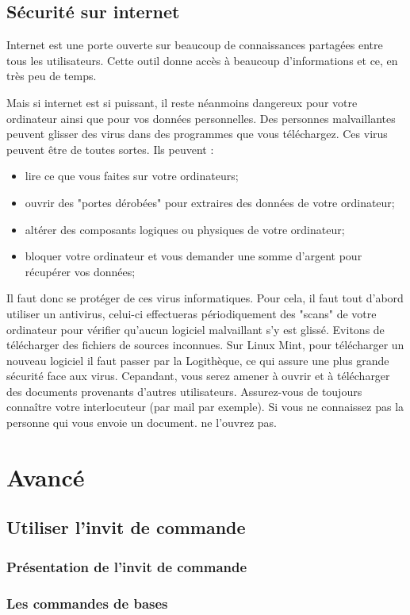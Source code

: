 \documentclass[12pt]{book}
\begin{document}
	\section{Sécurité sur internet}
		Internet est une porte ouverte sur beaucoup de connaissances partagées entre tous les utilisateurs.
		Cette outil donne accès à beaucoup d'informations et ce, en très peu de temps.\par
		Mais si internet est si puissant, il reste néanmoins dangereux pour votre ordinateur ainsi que pour vos données personnelles.
		Des personnes malvaillantes peuvent glisser des virus dans des programmes que vous téléchargez.
		Ces virus peuvent être de toutes sortes. Ils peuvent :
		\begin{itemize}
			\item lire ce que vous faites sur votre ordinateurs; 
			\item ouvrir des "portes dérobées" pour extraires des données de votre ordinateur;
			\item altérer des composants logiques ou physiques de votre ordinateur;
			\item bloquer votre ordinateur et vous demander une somme d'argent pour récupérer vos données;
		\end{itemize}
		Il faut donc se protéger de ces virus informatiques.
		Pour cela, il faut tout d'abord utiliser un antivirus, celui-ci effectueras périodiquement des "scans" de votre ordinateur pour vérifier qu'aucun logiciel malvaillant s'y est glissé.
		Evitons de télécharger des fichiers de sources inconnues.
		Sur Linux Mint, pour télécharger un nouveau logiciel il faut passer par la Logithèque, ce qui assure une plus grande sécurité face aux virus.
		Cepandant, vous serez amener à ouvrir et à télécharger des documents provenants d'autres utilisateurs.
		Assurez-vous de toujours connaître votre interlocuteur (par mail par exemple). 
		Si vous ne connaissez pas la personne qui vous envoie un document. ne l'ouvrez pas.\par

\chapter{Avancé}
\section{Utiliser l'invit de commande}\label{sec:utiliserterminal}
	\subsection{Présentation de l'invit de commande}
	\subsection{Les commandes de bases}
\end{document}
